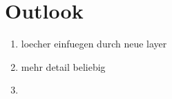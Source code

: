 \chapter{Outlook}
\label{sec:outlook}
\begin{enumerate}
    \item loecher einfuegen durch neue layer
    \item mehr detail beliebig
    \item 
\end{enumerate}